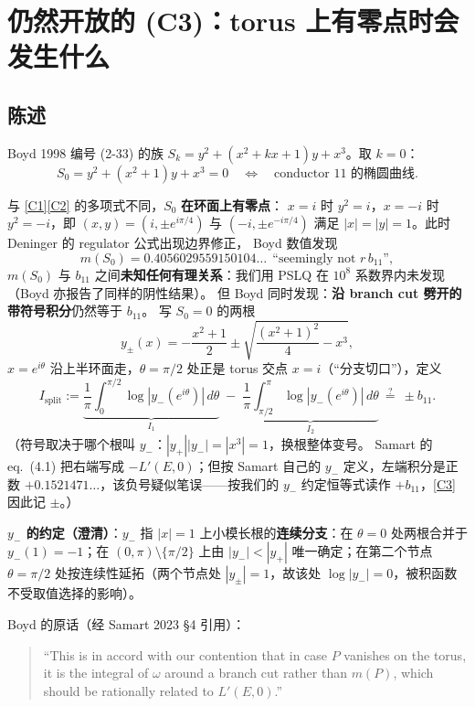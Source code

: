 \documentclass[11pt,a4paper]{ctexart}
\theoremstyle{remark}
\newcommand{\bN}{b_{11}}
\newcommand{\dd}{\,d}
\newcommand{\Isplit}{I_{\mathrm{split}}}
\begin{document}
\section{仍然开放的 (C3)：torus 上有零点时会发生什么}\label{sec:c3}

\subsection{陈述}

Boyd 1998 编号 (2-33) 的族 $S_k=y^2+(x^2+kx+1)y+x^3$。取 $k=0$：
\[
S_0=y^2+(x^2+1)y+x^3=0\quad\Longleftrightarrow\quad \text{conductor 11 的椭圆曲线}.
\]

与 \eqref{C1}\eqref{C2} 的多项式不同，$S_0$ \textbf{在环面上有零点}：
$x=i$ 时 $y^2=i$，$x=-i$ 时 $y^2=-i$，即 $(x,y)=(i,\pm e^{i\pi/4})$ 与
$(-i,\pm e^{-i\pi/4})$ 满足 $|x|=|y|=1$。此时 Deninger 的 regulator 公式出现边界修正，
Boyd 数值发现
\[
m(S_0)=0.4056029559150104\ldots\ \ \text{“seemingly not } r\,\bN\text{”},
\]
$m(S_0)$ 与 $\bN$ 之间\textbf{未知任何有理关系}：我们用 PSLQ 在 $10^8$ 系数界内未发现（Boyd 亦报告了同样的阴性结果）。
但 Boyd 同时发现：\textbf{沿 branch cut 劈开的带符号积分}仍然等于 $\bN$。
写 $S_0=0$ 的两根
\[
y_\pm(x)=-\frac{x^2+1}{2}\pm\sqrt{\frac{(x^2+1)^2}{4}-x^3},
\]
$x=e^{i\theta}$ 沿上半环面走，$\theta=\pi/2$ 处正是 torus 交点 $x=i$（“分支切口”），定义
\[
\Isplit:=\underbrace{\frac1\pi\int_0^{\pi/2}\log|y_-(e^{i\theta})|\dd\theta}_{I_1}
\;-\;\underbrace{\frac1\pi\int_{\pi/2}^{\pi}\log|y_-(e^{i\theta})|\dd\theta}_{I_2}
\ \stackrel?=\ \pm \bN. \tag{C3}\label{C3}
\]
（符号取决于哪个根叫 $y_-$：$|y_+||y_-|=|x^3|=1$，换根整体变号。
Samart 的 eq.~(4.1) 把右端写成 $-L'(E,0)$；但按 Samart 自己的 $y_-$ 定义，左端积分是正数
$+0.1521471\ldots$，该负号疑似笔误——按我们的 $y_-$ 约定恒等式读作 $+\bN$，\eqref{C3} 因此记 $\pm$。）

\textbf{$y_-$ 的约定（澄清）}：$y_-$ 指 $|x|=1$ 上小模长根的\textbf{连续分支}：在 $\theta=0$ 处两根合并于 $y_-(1)=-1$；在 $(0,\pi)\setminus\{\pi/2\}$ 上由 $|y_-|<|y_+|$ 唯一确定；在第二个节点 $\theta=\pi/2$ 处按连续性延拓（两个节点处 $|y_\pm|=1$，故该处 $\log|y_-|=0$，被积函数不受取值选择的影响）。

Boyd 的原话（经 Samart 2023 \S4 引用）：
\begin{quote}
``This is in accord with our contention that in case $P$ vanishes on the torus, it is the integral
of $\omega$ around a branch cut rather than $m(P)$, which should be rationally related to $L'(E,0)$.''
\end{quote}
\end{document}
